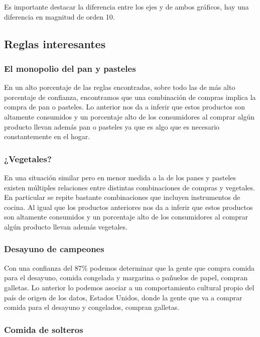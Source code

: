 \documentclass{article}
\begin{document}
Es importante destacar la diferencia entre los ejes y de ambos gráficos, hay una diferencia en magnitud de orden 10.

\subsection{Reglas interesantes}

\subsubsection{El monopolio del pan y pasteles}

En un alto porcentaje de las reglas encontradas, sobre todo las de más alto porcentaje de confianza, encontramos que una combinación de compras implica la compra de pan o pasteles. Lo anterior nos da a inferir que estos productos son altamente consumidos y un porcentaje alto de los consumidores al comprar algún producto llevan además pan o pasteles ya que es algo que es necesario constantemente en el hogar.

\subsubsection{¿Vegetales?}

En una situación similar pero en menor medida a la de los panes y pasteles existen múltiples relaciones entre distintas combinaciones de compras y vegetales. En particular se repite bastante combinaciones que incluyen instrumentos de cocina. Al igual que los productos anteriores nos da a inferir que estos productos son altamente consumidos y un porcentaje alto de los consumidores al comprar algún producto llevan además vegetales.

\subsubsection{Desayuno de campeones}

Con una confianza del 87\% podemos determinar que la gente que compra comida para el desayuno, comida congelada y margarina o pañuelos de papel, compran galletas. Lo anterior lo podemos asociar a un comportamiento cultural propio del país de origen de los datos, Estados Unidos, donde la gente que va a comprar comida para el desayuno y congelados, compran galletas.

\subsubsection{Comida de solteros}
\end{document}
